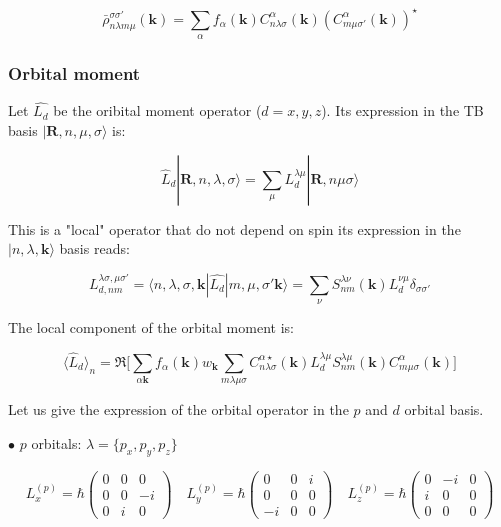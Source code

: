 \documentclass{article}
\newcommand{\bra}[1]{\langle #1|}
\newcommand{\ket}[1]{|#1\rangle}
\newcommand{\op}[1]{\hat{#1}}
\begin{document}
\[ \bar{\rho}_{n \lambda m \mu}^{\sigma\sigma'}(\mathbf{k})=  \sum_{\alpha}  f_{\alpha}(\mathbf{k})
C_{n \lambda \sigma}^{\alpha}(\mathbf{k})(C_{m \mu \sigma'}^{\alpha}(\mathbf{k}))^{\star}    \]

\subsubsection{Orbital moment}

\noindent
Let $\op{L_{d}}$ be the oribital moment operator ($d=x,y,z$). Its expression in the TB basis $\ket{\mathbf{R},n,\mu,\sigma}$ is:

\[ \op{L}_{d} \ket{\mathbf{R},n,\lambda,\sigma} = \sum_{\mu} L_{d}^{\lambda\mu}\ket{\mathbf{R},n \mu \sigma} \]


\noindent
This is a "local" operator that do not depend on spin
its expression in the $\ket{n,\lambda,\mathbf{k}}$ basis reads:

\[ L_{d ,n m}^{\lambda \sigma, \mu \sigma'}= 
\bra{ n,\lambda,\sigma,\mathbf{k}}\op{L_{d}}\ket{ m,\mu, \sigma'\mathbf{k}}=
\sum_{\nu} S_{nm}^{\lambda\nu}(\mathbf{k})L_{d}^{\nu\mu} \delta_{\sigma \sigma'}
 \]

 \noindent
The local component of the orbital moment is:

\[ \langle \op{L}_d \rangle_n = \Re \Bigg [ \sum_{\alpha \mathbf{k}} f_{\alpha}(\mathbf{k}) w_{\mathbf{k}}\sum_{m \lambda \mu \sigma} C_{n \lambda \sigma}^{\alpha \star}(\mathbf{k}) L_{d}^{\lambda \mu} S_{nm}^{\lambda \mu}(\mathbf{k})C_{m \mu \sigma}^{\alpha}(\mathbf{k}) \Bigg ]\]

\noindent
Let us give the expression of the orbital operator in the $p$ and $d$ orbital basis.

\vspace{0.5cm}
\noindent
$\bullet$ $p$ orbitals: $\lambda=\{p_x,p_y,p_z\}$ 

\begin{equation*}
L_x^{(p)} = \hbar \begin{pmatrix}
 0 & 0 & 0 \\
 0 & 0 & -i \\
 0 & i & 0
\end{pmatrix}
\quad
L_y^{(p)} = \hbar \begin{pmatrix}
 0 &  0 & i \\
 0 &  0 & 0 \\
-i &  0 & 0
\end{pmatrix}
\quad
L_z^{(p)} = \hbar \begin{pmatrix}
 0 & -i &  0 \\
 i &  0 &  0 \\
 0 &  0 &  0
\end{pmatrix}
\end{equation*}
\end{document}
